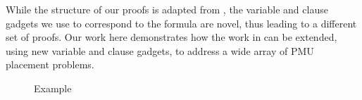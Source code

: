 
While the structure of our proofs is adapted from \cite{Brueni05}, the variable and clause gadgets we use to correspond to the \sat formula are novel, thus leading to a 
different set of proofs. Our work here demonstrates how the work in \cite{Brueni05} can be extended, using new variable and clause gadgets, to address a wide array of PMU placement problems.

\begin{figure}[t]


\caption{Example } 
\end{figure}



